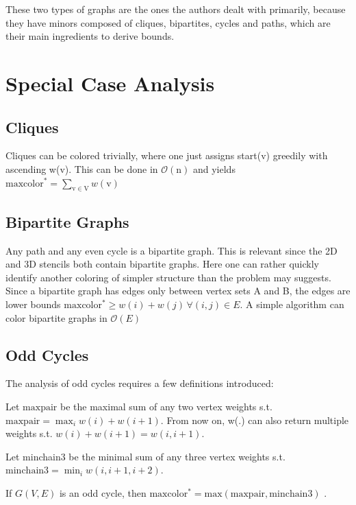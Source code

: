 \documentclass[sigconf]{acmart}
\begin{document}
\noindent These two types of graphs are the ones the authors dealt with primarily, because they
have minors composed of cliques, bipartites, cycles and paths, which are their main ingredients to derive bounds.

\section{Special Case Analysis}
\subsection*{Cliques}
Cliques can be colored trivially, where one just assigns start(v) greedily with ascending w(v).
This can be done in $\mathcal{O}(\mathrm{n})$ and yields $\mathrm{maxcolor^*} = 
\sum_{\mathrm{v} \in \mathrm{V}} w(\mathrm{v})$

\subsection*{Bipartite Graphs}
Any path and any even cycle is a bipartite graph. This is relevant since the 2D and 3D stencils
both contain bipartite graphs. Here one can rather quickly identify another coloring of simpler structure
than the problem may suggests. Since a bipartite graph has edges only between vertex sets A and B,
the edges are lower bounds $\mathrm{maxcolor^*} \geq w(i) + w(j) \, \forall (i,j) \in E$.
A simple algorithm can color bipartite graphs in $\mathcal{O}(E)$
\subsection*{Odd Cycles}
The analysis of odd cycles requires a few definitions introduced:
\begin{definition}
  Let $\mathrm{maxpair}$ be the maximal sum of any two vertex weights s.t. 
  $\mathrm{maxpair} = \max_i w(i) + w(i+1)$. From now on, w(.) can also
  return multiple weights s.t. $w(i) + w(i+1) = w(i,i+1)$.
\end{definition}

\begin{definition}
  Let minchain3 be the minimal sum of any three vertex weights s.t.
  $\mathrm{minchain3} = \min_i w(i, i+1, i+2)$.
\end{definition}

\begin{theorem}
  If $G(V,E)$ is an odd cycle, then \newline
  $\mathrm{maxcolor^*} = \mathrm{max(maxpair, minchain3)}$ \cite{main_paper}.
  \label{maxcolor_theorem}
\end{theorem}
\end{document}
